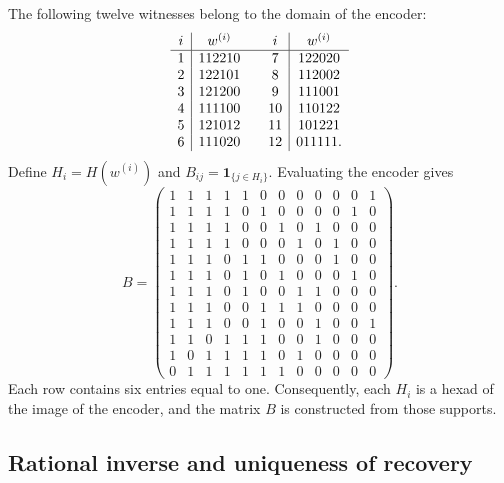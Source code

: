 The following twelve witnesses belong to the domain of the encoder:
\[
\begin{array}{c|c@{\qquad}c|c}
i&w^{(i)}&i&w^{(i)}\\\hline
1&112210&7&122020\\
2&122101&8&112002\\
3&121200&9&111001\\
4&111100&10&110122\\
5&121012&11&101221\\
6&111020&12&011111.
\end{array}
\]
Define $H_i=H(w^{(i)})$ and
$B_{ij}=\mathbf1_{\{j\in H_i\}}$. Evaluating the encoder gives
\begingroup\small\setlength{\arraycolsep}{3pt}
\setcounter{MaxMatrixCols}{12}
\begin{equation}
B=\begin{pmatrix}
1&1&1&1&1&0&0&0&0&0&0&1\\
1&1&1&1&0&1&0&0&0&0&1&0\\
1&1&1&1&0&0&1&0&1&0&0&0\\
1&1&1&1&0&0&0&1&0&1&0&0\\
1&1&1&0&1&1&0&0&0&1&0&0\\
1&1&1&0&1&0&1&0&0&0&1&0\\
1&1&1&0&1&0&0&1&1&0&0&0\\
1&1&1&0&0&1&1&1&0&0&0&0\\
1&1&1&0&0&1&0&0&1&0&0&1\\
1&1&0&1&1&1&0&0&1&0&0&0\\
1&0&1&1&1&1&0&1&0&0&0&0\\
0&1&1&1&1&1&1&0&0&0&0&0
\end{pmatrix}.
\label{rh:eq:incidencia}
\end{equation}
\endgroup
Each row contains six entries equal to one. Consequently, each
$H_i$ is a hexad of the image of the encoder, and the matrix $B$ is
constructed from those supports.

\subsection{Rational inverse and uniqueness of recovery}

